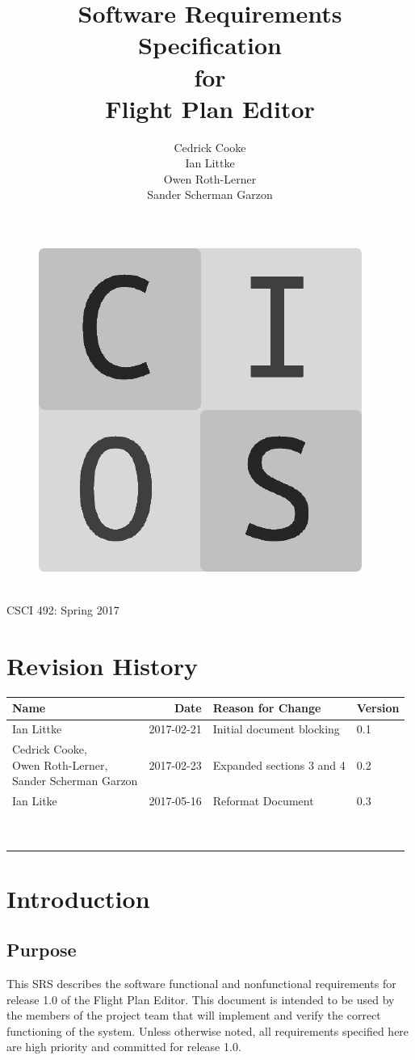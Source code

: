 \documentclass[12pt, letterpaper]{article}
\title{Software Requirements Specification\\for\\Flight Plan Editor}
\date{}
\author{
Cedrick Cooke\\
Ian Littke\\
Owen Roth-Lerner\\
Sander Scherman Garzon\\
}
\makeatletter
\renewcommand{\maketitle}{\bgroup\setlength{\parindent}{0pt}
\thispagestyle{empty}
\null
  \begin{flushleft}
  \vspace{15mm}
  \vskip2mm
  \Huge{\textbf{\@title}}
  \vspace{7cm}
\begin{figure}[ht]
  \begin{minipage}[b]{0.45\linewidth}
    \includegraphics[width=.75\textwidth]{images/cios.png}
  \end{minipage}
  \hspace{0.5cm}
  \begin{minipage}[b][][c]{0.45\linewidth}
    \LARGE{\@author}
  \vspace{0.35cm}
  \end{minipage}
\end{figure}
\\CSCI 492: Spring 2017\\
  \end{flushleft}\egroup
}
\makeatother
\begin{document}
\maketitle

\newpage
\thispagestyle{empty}
\section*{Revision History}
\begin{tabularx}{\textwidth}{|l|r|X|l|}
  \hline
\textbf{Name} & \textbf{Date} & \textbf{Reason for Change} & \textbf{Version} \\ \hline
Ian Littke & 2017-02-21 & Initial document blocking & 0.1 \\ \hline
\makecell[cl]{Cedrick Cooke,\\ Owen Roth-Lerner,\\ Sander Scherman Garzon} & 2017-02-23 & Expanded sections 3 and 4 & 0.2 \\ \hline
Ian Litke & 2017-05-16 & Reformat Document & 0.3 \\ \hline
          &            &                   &     \\ \hline
          &            &                   &     \\ \hline
          &            &                   &     \\ \hline
          &            &                   &     \\ \hline
          &            &                   &     \\ \hline
          &            &                   &     \\ \hline
          &            &                   &     \\ \hline
          &            &                   &     \\ \hline
          &            &                   &     \\ \hline
\end{tabularx}

\newpage
\setcounter{page}{1}
\tableofcontents
\newpage
{}
\setcounter{page}{1}

\section{Introduction}
  \subsection{Purpose}
    This SRS describes the software functional and nonfunctional requirements
    for release 1.0 of the Flight Plan Editor.
    This document is intended to be used by the members of the project team that will implement
    and verify the correct functioning of the system.
    Unless otherwise noted, all requirements specified here are high priority
    and committed for release 1.0.
\end{document}

